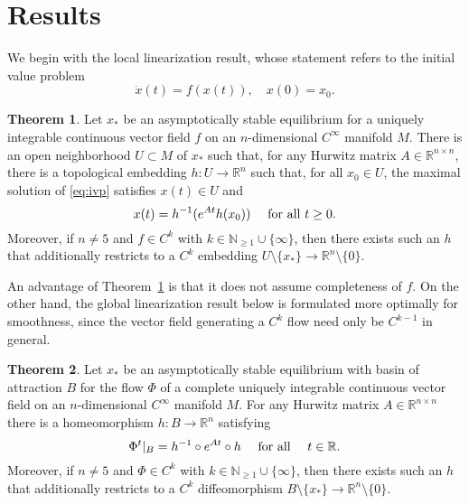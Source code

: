 \documentclass[11pt]{amsart}
\newcommand{\N}{\mathbb{N}}
\newcommand{\R}{\mathbb{R}}
\theoremstyle{definition}
\newtheorem{Th}{Theorem}
\begin{document}
\section{Results}\label{sec:results}

We begin with the local linearization result, whose statement refers to the initial value problem
\begin{equation}\label{eq:ivp}
	\dot{x}(t)=f(x(t)),\quad x(0)=x_0.	
\end{equation}


\begin{Th}\label{th:local-lin}
	Let $x_*$ be an asymptotically stable equilibrium for a uniquely integrable continuous vector field $f$ on an $n$-dimensional $C^\infty$ manifold $M$.
	There is an open neighborhood $U\subset M$ of $x_*$ such that, for any Hurwitz matrix $A\in \R^{n\times n}$, there is a topological embedding $h\colon U\to\R^n$ such that, for all $x_0\in U$, the maximal solution of \eqref{eq:ivp} satisfies $x(t)\in U$ and
	\begin{equation}\label{eq:th:local-lin}
		\textnormal{$x(t)=h^{-1}(e^{At}h(x_0))$ \quad for all $t\geq 0$.}	
	\end{equation}
	Moreover, if $n\neq 5$ and $f\in C^k$ with $k\in \N_{\geq 1}\cup \{\infty\}$,  then there exists such an $h$ that additionally restricts to a $C^k$ embedding $U\setminus \{x_*\}\to \R^n\setminus \{0\}$.
\end{Th}

An advantage of Theorem~\ref{th:local-lin} is that it does not assume completeness of $f$.
On the other hand, the global linearization result below is formulated more optimally for smoothness, since the vector field generating a $C^k$ flow need only be $C^{k-1}$ in general.


\begin{Th}\label{th:global-lin}
	Let $x_*$ be an asymptotically stable equilibrium with basin of attraction $B$ for the flow $\Phi$ of a complete uniquely integrable continuous vector field on an $n$-dimensional $C^\infty$  manifold $M$.
	For any Hurwitz matrix $A\in \R^{n\times n}$ there is a homeomorphism $h\colon B\to \R^n$ satisfying
	\begin{equation}\label{eq:th:global-lin}
		\textnormal{$\Phi^t|_B = h^{-1} \circ e^{At}\circ h$ \quad for all \quad $t\in \R$.}
	\end{equation}
	Moreover, if $n\neq 5$ and $\Phi\in C^k$ with $k\in \N_{\geq 1}\cup \{\infty\}$,  then there exists such an $h$ that additionally restricts to a $C^k$ diffeomorphism $B\setminus \{x_*\}\to \R^n\setminus \{0\}$.
\end{Th}
\end{document}
